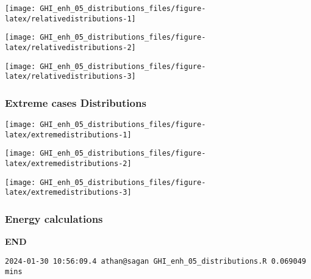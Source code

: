 \documentclass[
  10pt,
  a4paper,oneside]{article}
\begin{document}
\begin{center}\texttt{[image: GHI\_enh\_05\_distributions\_files/figure-latex/relativedistributions-1]} \end{center}

\begin{center}\texttt{[image: GHI\_enh\_05\_distributions\_files/figure-latex/relativedistributions-2]} \end{center}

\begin{center}\texttt{[image: GHI\_enh\_05\_distributions\_files/figure-latex/relativedistributions-3]} \end{center}

\FloatBarrier

\hypertarget{extreme-cases-distributions}{%
\subsubsection{Extreme cases Distributions}\label{extreme-cases-distributions}}

\begin{center}\texttt{[image: GHI\_enh\_05\_distributions\_files/figure-latex/extremedistributions-1]} \end{center}

\begin{center}\texttt{[image: GHI\_enh\_05\_distributions\_files/figure-latex/extremedistributions-2]} \end{center}

\begin{center}\texttt{[image: GHI\_enh\_05\_distributions\_files/figure-latex/extremedistributions-3]} \end{center}

\FloatBarrier

\hypertarget{energy-calculations}{%
\subsubsection{Energy calculations}\label{energy-calculations}}

\textbf{END}

\begin{verbatim}
2024-01-30 10:56:09.4 athan@sagan GHI_enh_05_distributions.R 0.069049 mins
\end{verbatim}
\end{document}
